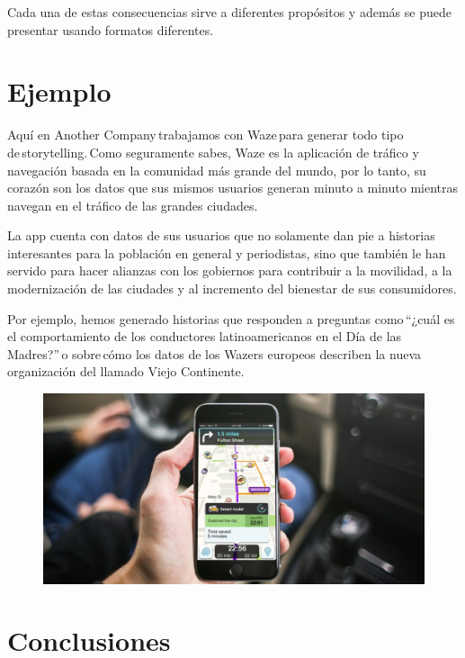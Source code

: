 {{\begin{itemize}
Cada una de estas consecuencias sirve a diferentes propósitos y además se puede presentar usando formatos diferentes.

	\end{itemize}

\section{Ejemplo}

\item{Aquí en Another Company trabajamos con Waze para generar todo tipo de storytelling. Como seguramente sabes, Waze es la aplicación de tráfico y navegación basada en la comunidad más grande del mundo, por lo tanto, su corazón son los datos que sus mismos usuarios generan minuto a minuto mientras navegan en el tráfico de las grandes ciudades. 

La app cuenta con datos de sus usuarios que no solamente dan pie a historias interesantes para la población en general y periodistas, sino que también le han servido para hacer alianzas con los gobiernos para contribuir a la movilidad, a la modernización de las ciudades y al incremento del bienestar de sus consumidores. 

Por ejemplo, hemos generado historias que responden a preguntas como “¿cuál es el comportamiento de los conductores latinoamericanos en el Día de las Madres?” o sobre cómo los datos de los Wazers europeos describen la nueva organización del llamado Viejo Continente. }

\begin{figure}[htb]
\begin{center}
\includegraphics[width=15cm]{./Imagenes/waze2}
\end{center}
\end{figure}

\section{Conclusiones}

}}
